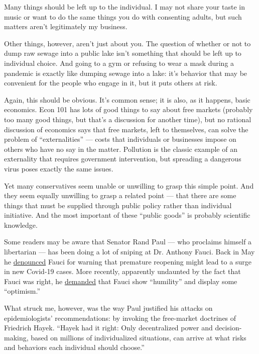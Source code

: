 Many things should be left up to the individual. I may not share your
taste in music or want to do the same things you do with consenting
adults, but such matters aren't legitimately my business.

Other things, however, aren't just about you. The question of whether or
not to dump raw sewage into a public lake isn't something that should be
left up to individual choice. And going to a gym or refusing to wear a
mask during a pandemic is exactly like dumping sewage into a lake: it's
behavior that may be convenient for the people who engage in it, but it
puts others at risk.

Again, this should be obvious. It's common sense; it is also, as it
happens, basic economics. Econ 101 has lots of good things to say about
free markets (probably too many good things, but that's a discussion for
another time), but no rational discussion of economics says that free
markets, left to themselves, can solve the problem of ``externalities''
--- costs that individuals or businesses impose on others who have no
say in the matter. Pollution is the classic example of an externality
that requires government intervention, but spreading a dangerous virus
poses exactly the same issues.

Yet many conservatives seem unable or unwilling to grasp this simple
point. And they seem equally unwilling to grasp a related point --- that
there are some things that must be supplied through public policy rather
than individual initiative. And the most important of these ``public
goods'' is probably scientific knowledge.

Some readers may be aware that Senator Rand Paul --- who proclaims
himself a libertarian --- has been doing a lot of sniping at Dr. Anthony
Fauci. Back in May he
\href{https://www.washingtonpost.com/politics/2020/05/12/fauci-testimony-senate-coronavirus/}{denounced}
Fauci for warning that premature reopening might lead to a surge in new
Covid-19 cases. More recently, apparently undaunted by the fact that
Fauci was right, he
\href{https://www.washingtonpost.com/politics/2020/06/30/we-just-need-some-more-optimism-rand-pauls-crusade-against-anthony-fauci-take-curious-turn/}{demanded}
that Fauci show ``humility'' and display some ``optimism.''

What struck me, however, was the way Paul justified his attacks on
epidemiologists' recommendations: by invoking the free-market doctrines
of Friedrich Hayek. ``Hayek had it right: Only decentralized power and
decision-making, based on millions of individualized situations, can
arrive at what risks and behaviors each individual should choose.''

